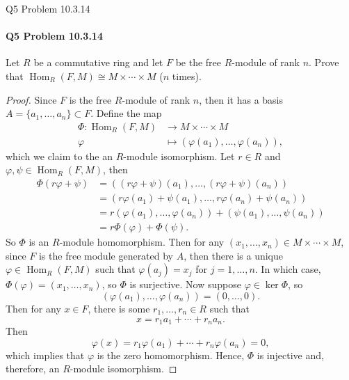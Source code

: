 \documentclass[12pt]{article}
\newenvironment{fullbox}{\begin{lrbox}{\savefullbox}\begin{minipage}{\dimexpr\textwidth-2\fboxsep\relax}}{\end{minipage}\end{lrbox}\begin{center}\framebox[\textwidth]{\usebox{\savefullbox}}\end{center}}
\newenvironment{pbox}[1][]{\begin{fullbox}\ifx#1\empty\else\paragraph{#1}\fi}{\end{fullbox}}
\theoremstyle{definition}
\renewcommand{\phi}{\varphi}
\newcommand{\isom}{\cong}
\newcommand{\Hom}{\operatorname{Hom}}
\begin{document}
\newpage
\begin{pbox}[Q5 Problem 10.3.14]
    Let $R$ be a commutative ring and let $F$ be the free $R$-module of rank $n$. Prove that $\Hom_R(F, M) \isom M \times \cdots \times M$ ($n$ times).
\end{pbox}

\begin{proof}
    Since $F$ is the free $R$-module of rank $n$, then it has a basis $A = \{a_1, \dots, a_n\} \subset F$.
    Define the map
    \begin{align*}
        \Phi : \Hom_R(F, M) &\to M \times \cdots \times M \\
            \phi &\mapsto (\phi(a_1), \dots, \phi(a_n)),
    \end{align*}
    which we claim to the an $R$-module isomorphism. Let $r \in R$ and $\phi, \psi \in \Hom_R(F, M)$, then
    \begin{align*}
        \Phi(r\phi + \psi)
            &= ((r\phi + \psi)(a_1), \dots, (r\phi + \psi)(a_n)) \\
            &= (r\phi(a_1) + \psi(a_1), \dots, r\phi(a_n) + \psi(a_n)) \\
            &= r(\phi(a_1), \dots, \phi(a_n)) + (\psi(a_1), \dots, \psi(a_n)) \\
            &= r\Phi(\phi) + \Phi(\psi).
    \end{align*}
    So $\Phi$ is an $R$-module homomorphism. Then for any $(x_1, \dots, x_n) \in M \times \cdots \times M$, since $F$ is the free module generated by $A$, then there is a unique $\phi \in \Hom_R(F, M)$ such that $\phi(a_j) = x_j$ for $j = 1, \dots, n$. In which case, $\Phi(\phi) = (x_1, \dots, x_n)$, so $\Phi$ is surjective. Now suppose $\phi \in \ker\Phi$, so
    \[
        (\phi(a_1), \dots, \phi(a_n)) = (0, \dots, 0).
    \]
    Then for any $x \in F$, there is some $r_1, \dots, r_n \in R$ such that
    \[
        x = r_1a_1 + \cdots + r_na_n.
    \]
    Then
    \[
        \phi(x)
            = r_1\phi(a_1) + \cdots + r_n\phi(a_n)
            = 0,
    \]
    which implies that $\phi$ is the zero homomorphism. Hence, $\Phi$ is injective and, therefore, an $R$-module isomorphism.
    
\end{proof}
\end{document}
